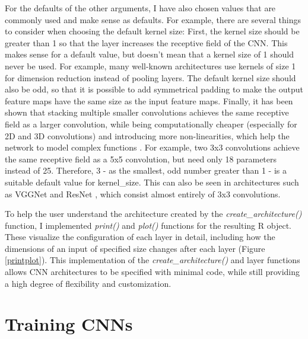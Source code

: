 \documentclass[12pt,twoside]{scrreport}
\newcommand{\fn}[2][]{\textit{#2(}#1\textit{)}}
\begin{document}
For the defaults of the other arguments, I have also chosen values that are commonly used and make sense as defaults. For example, there are several things to consider when choosing the default kernel size: First, the kernel size should be greater than 1 so that the layer increases the receptive field of the CNN. This makes sense for a default value, but doesn't mean that a kernel size of 1 should never be used. For example, many well-known architectures use kernels of size 1 for dimension reduction instead of pooling layers. The default kernel size should also be odd, so that it is possible to add symmetrical padding to make the output feature maps have the same size as the input feature maps. Finally, it has been shown that stacking multiple smaller convolutions achieves the same receptive field as a larger convolution, while being computationally cheaper (especially for 2D and 3D convolutions) and introducing more non-linearities, which help the network to model complex functions \citep{simonyanVeryDeepConvolutional2015}. For example, two 3x3 convolutions achieve the same receptive field as a 5x5 convolution, but need only 18 parameters instead of 25. Therefore, 3 - as the smallest, odd number greater than 1 - is a suitable default value for kernel\_size. This can also be seen in architectures such as VGGNet \citep{simonyanVeryDeepConvolutional2015} and ResNet \citep{heDeepResidualLearning2015}, which consist almost entirely of 3x3 convolutions.

To help the user understand the architecture created by the \fn{create\_architecture} function, I implemented \fn{print} and \fn{plot} functions for the resulting R object. These visualize the configuration of each layer in detail, including how the dimensions of an input of specified size changes after each layer (Figure \ref{printplot}). This implementation of the \fn{create\_architecture} and layer functions allows CNN architectures to be specified with minimal code, while still providing a high degree of flexibility and customization.

\section*{Training CNNs}
\end{document}
